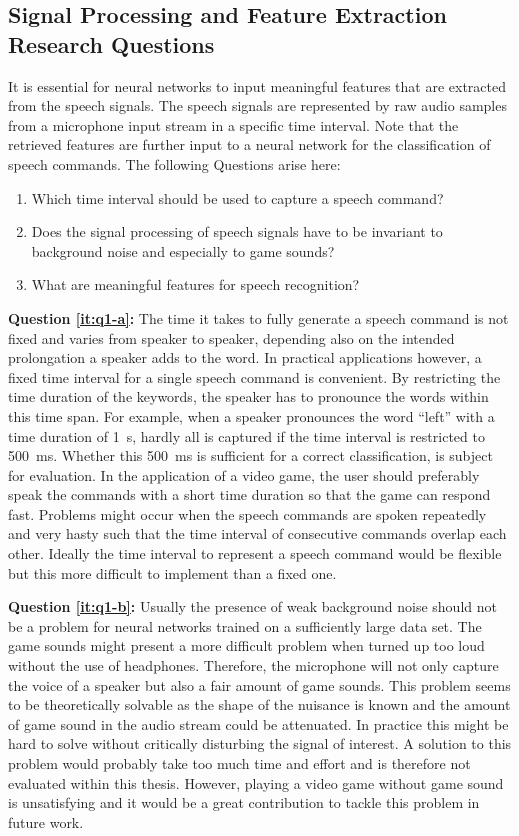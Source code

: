 \subsection{Signal Processing and Feature Extraction Research Questions}\label{sec:intro_rq_signal}
It is essential for neural networks to input meaningful features that are extracted from the speech signals. 
The speech signals are represented by raw audio samples from a microphone input stream in a specific time interval.
Note that the retrieved features are further input to a neural network for the classification of speech commands.
The following Questions arise here:
\begin{enumerate}[label={Q.1.\alph*)}, leftmargin=1.75cm]
  \item Which time interval should be used to capture a speech command?\label{it:q1-a}
  \item Does the signal processing of speech signals have to be invariant to background noise and especially to game sounds?\label{it:q1-b}
  \item What are meaningful features for speech recognition?\label{it:q1-c}
\end{enumerate}
\noindent
\textbf{Question \ref{it:q1-a}:} 
The time it takes to fully generate a speech command is not fixed and varies from speaker to speaker, depending also on the intended prolongation a speaker adds to the word.
In practical applications however, a fixed time interval for a single speech command is convenient.
By restricting the time duration of the keywords, the speaker has to pronounce the words within this time span.
For example, when a speaker pronounces the word \enquote{left} with a time duration of \SI{1}{\second}, hardly all is captured if the time interval is restricted to \SI{500}{\milli\second}.
Whether this \SI{500}{\milli\second} is sufficient for a correct classification, is subject for evaluation.
In the application of a video game, the user should preferably speak the commands with a short time duration so that the game can respond fast.
Problems might occur when the speech commands are spoken repeatedly and very hasty such that the time interval of consecutive commands overlap each other.
Ideally the time interval to represent a speech command would be flexible but this more difficult to implement than a fixed one.

\textbf{Question \ref{it:q1-b}:}
Usually the presence of weak background noise should not be a problem for neural networks trained on a sufficiently large data set. 
The game sounds might present a more difficult problem when turned up too loud without the use of headphones. 
Therefore, the microphone will not only capture the voice of a speaker but also a fair amount of game sounds. 
This problem seems to be theoretically solvable as the shape of the nuisance is known and the amount of game sound in the audio stream could be attenuated.
In practice this might be hard to solve without critically disturbing the signal of interest.
A solution to this problem would probably take too much time and effort and is therefore not evaluated within this thesis. 
However, playing a video game without game sound is unsatisfying and it would be a great contribution to tackle this problem in future work.

